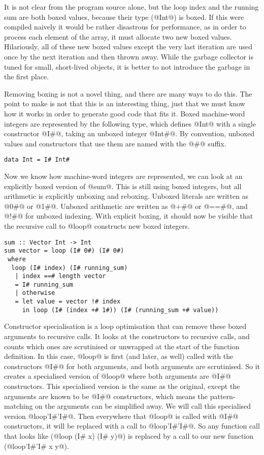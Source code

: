 It is not clear from the program source alone, but the loop index and the running sum are both boxed values, because their type (@Int@) is boxed.
If this were compiled naively it would be rather disastrous for performance, as in order to process each element of the array, it must allocate two new boxed values.
Hilariously, all of these new boxed values except the very last iteration are used once by the next iteration and then thrown away.
While the garbage collector is tuned for small, short-lived objects, it is better to not introduce the garbage in the first place.

Removing boxing is not a novel thing, and there are many ways to do this.
The point to make is not that this is an interesting thing, just that we must know how it works in order to generate good code that fits it.
Boxed machine-word integers are represented by the following type, which defines @Int@ with a single constructor @I#@, taking an unboxed integer @Int#@. By convention, unboxed values and constructors that use them are named with the @#@ suffix.

\begin{lstlisting}
data Int = I# Int#
\end{lstlisting}

Now we know how machine-word integers are represented, we can look at an explicitly boxed version of @sum@.
This is still using boxed integers, but all arithmetic is explicitly unboxing and reboxing.
Unboxed literals are written as @0#@ or @1#@.
Unboxed arithmetic are written as @+#@ or @==#@, and @!#@ for unboxed indexing.
With explicit boxing, it should now be visible that the recursive call to @loop@ constructs new boxed integers.

\begin{lstlisting}
sum :: Vector Int -> Int
sum vector = loop (I# 0#) (I# 0#)
 where
  loop (I# index) (I# running_sum)
   | index ==# length vector
   = I# running_sum
   | otherwise
   = let value = vector !# index
     in loop (I# (index +# 1#)) (I# (running_sum +# value))
\end{lstlisting}

Constructor specialisation \cite{peyton2007call} is a loop optimisation that can remove these boxed arguments to recursive calls.
It looks at the constructors to recursive calls, and counts which ones are scrutinised or unwrapped at the start of the function definition.
In this case, @loop@ is first (and later, as well) called with the constructors @I#@ for both arguments, and both arguments are scrutinised.
So it creates a specialised version of @loop@ where both arguments are @I#@ constructors.
This specialised version is the same as the original, except the arguments are known to be @I#@ constructors, which means the pattern-matching on the arguments can be simplified away.
We will call this specialised version @loop'I#'I#@.
Then everywhere that @loop@ is called with @I#@ constructors, it will be replaced with a call to @loop'I#'I#@.
So any function call that looks like (@loop (I# x) (I# y)@) is replaced by a call to our new function (@loop'I#'I# x y@).

